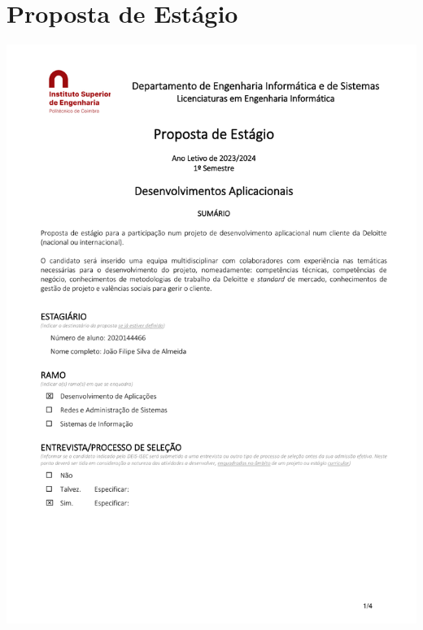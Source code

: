 \section{Proposta de Estágio}\label{sec:prop-estagio}

    \renewcommand*{\thepage}{A\arabic{page}}

    \begin{center}
        \includegraphics[page=1,scale=0.724]{./imgs/Proposta_Estágio_João_Almeida.pdf}

        
    \end{center}
